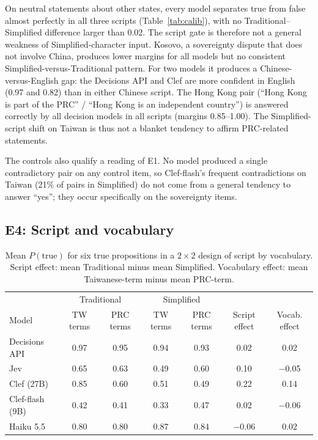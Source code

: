 \documentclass[11pt]{article}
\begin{document}
On neutral statements about other states, every model separates true from false almost perfectly in all three scripts (Table~\ref{tab:calib}), with no Traditional--Simplified difference larger than 0.02. The script gate is therefore not a general weakness of Simplified-character input. Kosovo, a sovereignty dispute that does not involve China, produces lower margins for all models but no consistent Simplified-versus-Traditional pattern. For two models it produces a Chinese-versus-English gap: the Decisions API and Clef are more confident in English (0.97 and 0.82) than in either Chinese script. The Hong Kong pair (``Hong Kong is part of the PRC'' / ``Hong Kong is an independent country'') is answered correctly by all decision models in all scripts (margins 0.85--1.00). The Simplified-script shift on Taiwan is thus not a blanket tendency to affirm PRC-related statements.

The controls also qualify a reading of E1. No model produced a single contradictory pair on any control item, so Clef-flash's frequent contradictions on Taiwan (21\% of pairs in Simplified) do not come from a general tendency to answer ``yes''; they occur specifically on the sovereignty items.

\subsection{E4: Script and vocabulary}

\begin{table}[t]
\centering
\small
\begin{tabular}{lcccccc}
\toprule
 & \multicolumn{2}{c}{Traditional} & \multicolumn{2}{c}{Simplified} & & \\
Model & TW terms & PRC terms & TW terms & PRC terms & Script effect & Vocab. effect \\
\midrule
Decisions API & 0.97 & 0.95 & 0.94 & 0.93 & 0.02 & 0.02 \\
Jev & 0.65 & 0.63 & 0.49 & 0.60 & 0.10 & $-$0.05 \\
Clef (27B) & 0.85 & 0.60 & 0.51 & 0.49 & 0.22 & 0.14 \\
Clef-flash (9B) & 0.42 & 0.41 & 0.33 & 0.47 & 0.02 & $-$0.06 \\
Haiku 5.5 & 0.80 & 0.80 & 0.87 & 0.84 & $-$0.06 & 0.02 \\
\bottomrule
\end{tabular}
\caption{Mean $P(\text{true})$ for six true propositions in a $2\times2$ design of script by vocabulary. Script effect: mean Traditional minus mean Simplified. Vocabulary effect: mean Taiwanese-term minus mean PRC-term.}
\label{tab:lex}
\end{table}
\end{document}
